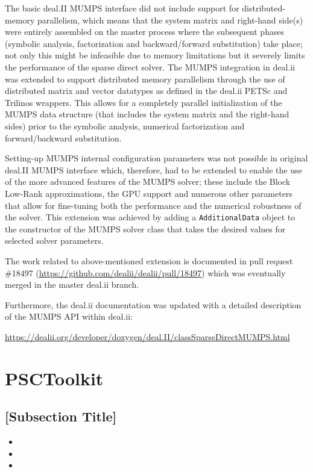 \documentclass[a4paper,12pt]{article}
\begin{document}
The basic deal.II MUMPS interface did not include support for
distributed-memory parallelism, which means that the system matrix and
right-hand side(s) were entirely assembled on the master process where
the subsequent phases (symbolic analysis, factorization and
backward/forward substitution) take place; not only this might be
infeasible due to memory limitations but it severely limits the
performance of the sparse direct solver. The MUMPS integration in
deal.ii was extended to support distributed memory parallelism through
the use of distributed matrix and vector datatypes as defined in the
deal.ii PETSc and Trilinos wrappers. This allows for a completely
parallel initialization of the MUMPS data structure (that includes the
system matrix and the right-hand sides) prior to the symbolic
analysis, numerical factorization and forward/backward substitution.

Setting-up MUMPS internal configuration parameters was not possible in
original deal.II MUMPS interface which, therefore, had to be
extended to enable the use of the more advanced features of the MUMPS
solver; these include the Block Low-Rank approximations, the GPU
support and numerous other parameters that allow for fine-tuning both
the performance and the numerical robustness of the solver. This
extension was achieved by adding a \texttt{AdditionalData} object
to the constructor of the MUMPS solver class that takes the desired
values for selected solver parameters.

The work related to above-mentioned extension is documented in pull
request \#18497 (\url{https://github.com/dealii/dealii/pull/18497})
which was eventually merged in the master deal.ii branch.

Furthermore, the deal.ii documentation was updated with a detailed description
of the MUMPS API within deal.ii:

\url{https://dealii.org/developer/doxygen/deal.II/classSparseDirectMUMPS.html}


\newpage

\section{PSCToolkit}
\label{sec:section3}

\lipsum[8-9]

\subsection{{[Subsection Title]}}
\begin{itemize}[left=1em, itemsep=0pt, topsep=0pt] 
    \item \lipsum[10][1-2]
    \item \lipsum[10][3-4]
    \item \lipsum[10][5-6]
\end{itemize}
\end{document}

